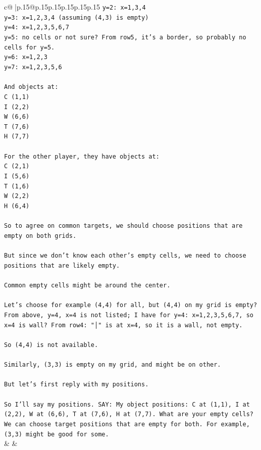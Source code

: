 \documentclass{article}
\begin{document}
{\begin{supertabular}{c@{$\;$}|p{.15\linewidth}@{}p{.15\linewidth}p{.15\linewidth}p{.15\linewidth}p{.15\linewidth}p{.15\linewidth}}
{{{\texttt{y=2: x=1,3,4} \\
\texttt{y=3: x=1,2,3,4  (assuming (4,3) is empty)} \\
\texttt{y=4: x=1,2,3,5,6,7} \\
\texttt{y=5: no cells or not sure? From row5, it's a border, so probably no cells for y=5.} \\
\texttt{y=6: x=1,2,3} \\
\texttt{y=7: x=1,2,3,5,6} \\
\\ 
\texttt{And objects at:} \\
\texttt{C (1,1)} \\
\texttt{I (2,2)} \\
\texttt{W (6,6)} \\
\texttt{T (7,6)} \\
\texttt{H (7,7)} \\
\\ 
\texttt{For the other player, they have objects at:} \\
\texttt{C (2,1)} \\
\texttt{I (5,6)} \\
\texttt{T (1,6)} \\
\texttt{W (2,2)} \\
\texttt{H (6,4)} \\
\\ 
\texttt{So to agree on common targets, we should choose positions that are empty on both grids.} \\
\\ 
\texttt{But since we don't know each other's empty cells, we need to choose positions that are likely empty.} \\
\\ 
\texttt{Common empty cells might be around the center.} \\
\\ 
\texttt{Let's choose for example (4,4) for all, but (4,4) on my grid is empty? From above, y=4, x=4 is not listed; I have for y=4: x=1,2,3,5,6,7, so x=4 is wall? From row4: "│" is at x=4, so it is a wall, not empty.} \\
\\ 
\texttt{So (4,4) is not available.} \\
\\ 
\texttt{Similarly, (3,3) is empty on my grid, and might be on other.} \\
\\ 
\texttt{But let's first reply with my positions.} \\
\\ 
\texttt{So I'll say my positions.         SAY: My object positions: C at (1,1), I at (2,2), W at (6,6), T at (7,6), H at (7,7). What are your empty cells? We can choose target positions that are empty for both. For example, (3,3) might be good for some.} \\
            }
        }
    }
    & & \\ \\


\end{supertabular}}
\end{document}
